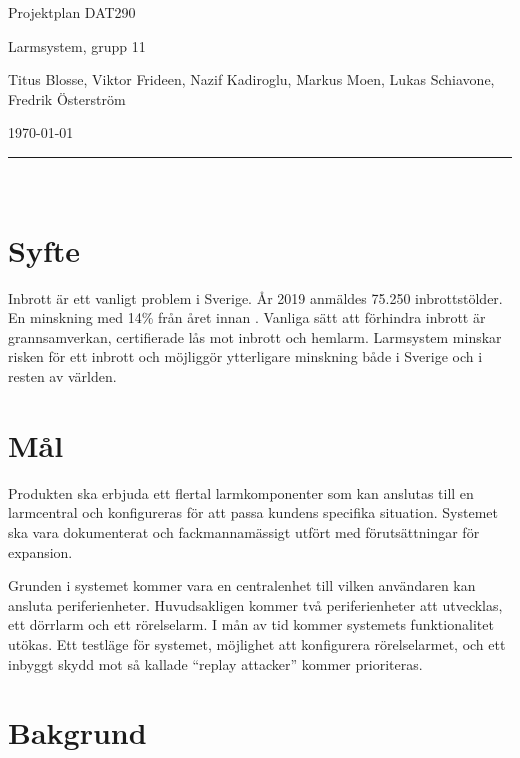 \documentclass[a4paper]{article}
\newcommand\namn{Larmsystem}
\begin{document}
\thispagestyle{empty}

\begin{center}
    \parskip=14pt
    \vspace*{3\parskip}

    {\LARGE Projektplan DAT290}

    {\large \namn, grupp 11

    Titus Blosse, Viktor Frideen, Nazif Kadiroglu, Markus Moen, Lukas Schiavone, Fredrik Österström

    \today}

    \rule{7cm}{0.4pt}\\
\end{center}
\newpage

\thispagestyle{empty}

\tableofcontents
\newpage



\section{Syfte}
Inbrott är ett vanligt problem i Sverige. År 2019 anmäldes 75.250 inbrottstölder. En minskning med 14\% från året innan \cite{brastold}. Vanliga sätt att förhindra inbrott är grannsamverkan, certifierade lås mot inbrott och hemlarm. Larmsystem minskar risken för ett inbrott och möjliggör ytterligare minskning både i Sverige och i resten av världen. 

\section{Mål}

Produkten ska erbjuda ett flertal larmkomponenter som kan anslutas till en larmcentral och konfigureras för att passa kundens specifika situation. Systemet ska vara dokumenterat och fackmannamässigt utfört med förutsättningar för expansion.

Grunden i systemet kommer vara en centralenhet till vilken användaren kan ansluta periferienheter. Huvudsakligen kommer två periferienheter att utvecklas, ett dörrlarm och ett rörelselarm. I mån av tid kommer systemets funktionalitet utökas. Ett testläge för systemet, möjlighet att konfigurera rörelselarmet, och ett inbyggt skydd mot så kallade ``replay attacker'' kommer prioriteras.

\section{Bakgrund}
\end{document}
